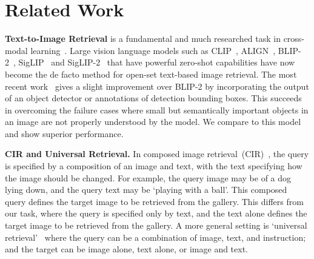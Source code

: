 \section{Related Work}
\label{sec:related_work}

\noindent \textbf{Text-to-Image Retrieval}  
is a fundamental and much researched task in cross-modal learning~\cite{lee2018stacked,chen2020imram,ji2021step,faghri2017vse++,zhang2022negative,radford2021learning,li2021align,chen2020uniter,wang2023image,yu2022coca,chen2024internvl,chen2020interclass,chen2021learning,chen2023vilem,chun2021probabilistic,diao2021similarity,engilberge2018deep,gu2018look,huang2017instance,ji2019saliency,karpathy2014deep,kim2023improving,li2019visual,liu2019focus,liu2020graph,song2019polysemous,thomas2020preserving,wang2020consensus,wang2018learning,wang2019camp,wang2023multilateral,wei2020universal,wei2020multi,yan2021discrete,zeng2022learning,zhang2022show,zhang2020context,zhang2018deep,zheng2019towards}.
Large vision language models such as CLIP~\cite{radford2021learning,openclip}, ALIGN~\cite{jia2021scaling}, BLIP-2~\cite{li2023blip}, SigLIP~\cite{zhai2023siglip} and SigLIP-2~\cite{tschannen2025siglip2} that have powerful zero-shot capabilities have now become the de facto method for open-set text-based image retrieval.
The most recent work~\cite{sogi2024object} gives a slight improvement over BLIP-2 by incorporating the output of an object detector or annotations of detection bounding boxes. This succeeds in overcoming the failure cases where small but semantically important objects in an image are not properly understood by the model. We compare to this model and show superior performance. 


\noindent \textbf{CIR and Universal Retrieval.}  
In composed image
retrieval~(CIR)~\cite{liu2023CIR,gu2023compodiff,baldrati2023zero,ventura2024covr}, 
the query is specified by a composition of an image and text, with the
text specifying how the image should be changed. For example, the query image may be of a dog lying down, and the query text may be `playing with a ball'. This composed query defines
the target image to be retrieved from the gallery. This differs from our task, where the query is specified
only by text, and the text alone defines the target image to be retrieved from the gallery.  A more general setting is `universal retrieval'~\cite{wei2023uniir,liu2025LamRA} 
where the query can be a combination of image,
text, and instruction;  and the target can be image alone, text alone, or image and text.


